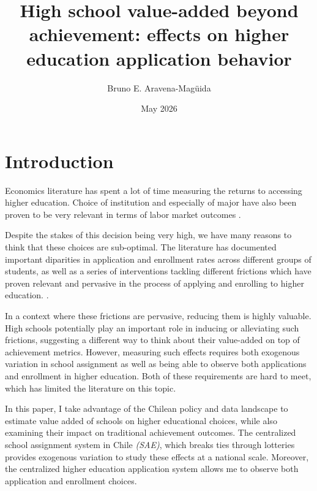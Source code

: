 \documentclass[a4paper, article, english, oneside, unknownkeysallowed, 12pt]{memoir}
\title{ High school value-added beyond achievement: effects on higher education application behavior}
\author{ Bruno E. Aravena-Magüida}
\date{May 2026}
\begin{document}
\maketitle

\setcounter{tocdepth}{2}
\renewcommand\contentsname{}

\section{Introduction}

Economics literature has spent a lot of time measuring the returns to accessing higher education. 
Choice of institution and especially of major have also been proven to be very relevant in terms of labor market outcomes \parencite{kirkeboen_field_2016}.



Despite the stakes of this decision being very high, we have many reasons to think that these choices are sub-optimal.
The literature has documented important diparities in application and enrollment rates across different groups of students, as well as a series of interventions tackling different frictions which have proven relevant and pervasive in the process of applying and enrolling to higher education. 
\parencite{chetty_diversifying_2025,hoxby_what_2015, dynarski_closing_2021, hastings_informed_2016}.


In a context where these frictions are pervasive, reducing them is highly valuable. 
High schools potentially play an important role in inducing or alleviating such frictions, suggesting a different way to think about their value-added on top of achievement metrics.
However, measuring such effects requires both exogenous variation in school assignment as well as being able to observe both applications and enrollment in higher education. 
Both of these requirements are hard to meet, which has limited the literature on this topic.


In this paper, I take advantage of the Chilean policy and data landscape to estimate value added of schools on higher educational choices, while also examining their impact on traditional achievement outcomes. 
The centralized school assignment system in Chile \textit{(SAE)}, which breaks ties through lotteries provides exogenous variation to study these effects at a national scale. Moreover, the centralized higher education application system allows me to observe both application and enrollment choices. 
\end{document}
